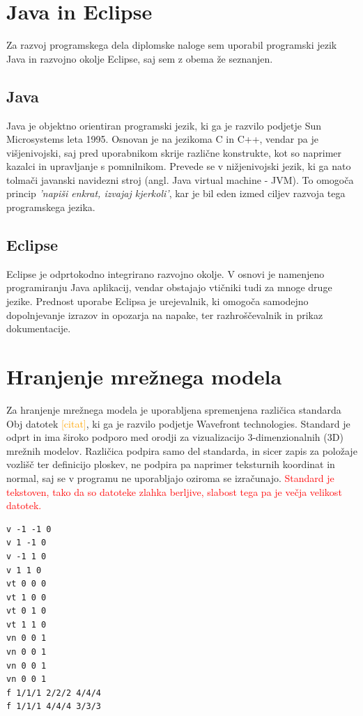 \documentclass[a4paper, 12pt]{book}
\begin{document}
\section{Java in Eclipse}
Za razvoj programskega dela diplomske naloge sem uporabil programski jezik Java in razvojno okolje Eclipse, saj sem z obema že seznanjen.
\subsection*{Java}
Java je objektno orientiran programski jezik, ki ga je razvilo podjetje Sun Microsystems leta 1995. Osnovan je na jezikoma C in C++, vendar pa je višjenivojski, saj pred uporabnikom skrije različne konstrukte, kot so naprimer kazalci in upravljanje s pomnilnikom. Prevede se v nižjenivojski jezik, ki ga nato tolmači javanski navidezni stroj (angl. Java virtual machine - JVM). To omogoča princip \emph{'napiši enkrat, izvajaj kjerkoli'}, kar je bil eden izmed ciljev razvoja tega programskega jezika.
\subsection*{Eclipse}
Eclipse je odprtokodno integrirano razvojno okolje. V osnovi je namenjeno programiranju Java aplikacij, vendar obstajajo vtičniki tudi za mnoge druge jezike. Prednost uporabe Eclipsa je urejevalnik, ki omogoča samodejno dopolnjevanje izrazov in opozarja na napake, ter razhroščevalnik in prikaz dokumentacije.
\section{Hranjenje mrežnega modela}

Za hranjenje mrežnega modela je uporabljena spremenjena različica standarda Obj datotek \textcolor{orange}{[citat]}, ki ga je razvilo podjetje Wavefront technologies. Standard je odprt in ima široko podporo med orodji za vizualizacijo 3-dimenzionalnih (3D) mrežnih modelov. Različica podpira samo del standarda, in sicer zapis za položaje vozlišč ter definicijo ploskev, ne podpira pa naprimer teksturnih koordinat in normal, saj se v programu ne uporabljajo oziroma se izračunajo.
\textcolor{red}{Standard je tekstoven, tako da so datoteke zlahka berljive, slabost tega pa je večja velikost datotek.}
\renewcommand{\lstlistingname}{Datoteka}
\renewcommand{\lstlistlistingname}{Seznam datotek}
\begin{lstlisting}[captionpos=b, frame=single, caption={Primer obj datoteke, ki predstavlja kvadrat.}]
v -1 -1 0
v 1 -1 0
v -1 1 0
v 1 1 0
vt 0 0 0
vt 1 0 0
vt 0 1 0
vt 1 1 0
vn 0 0 1
vn 0 0 1
vn 0 0 1
vn 0 0 1
f 1/1/1 2/2/2 4/4/4
f 1/1/1 4/4/4 3/3/3
\end{lstlisting}
\end{document}
